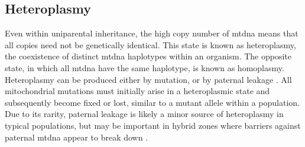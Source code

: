 \documentclass[12pt,twoside]{reedthesis}
\begin{document}
\subsection{Heteroplasmy}
Even within uniparental inheritance, the high copy number of \gls{mtdna} means that all copies need not be genetically identical.
This state is known as heteroplasmy, the coexistence of distinct \gls{mtdna} haplotypes within an organism.
The opposite state, in which all \gls{mtdna} have the same haplotype, is known as homoplasmy.
Heteroplasmy can be produced either by mutation, or by paternal leakage \citep{white_revealing_2008}.
All mitochondrial mutations must initially arise in a heteroplasmic state and subsequently become fixed or lost, similar to a mutant allele within a population. 
Due to its rarity, paternal leakage is likely a minor source of heteroplasmy in typical populations, but may be important in hybrid zones where barriers against paternal \gls{mtdna} appear to break down \citep{kaneda_elimination_1995, dokianakis_different_2014, radojicic_extensive_2015}. 
\end{document}
